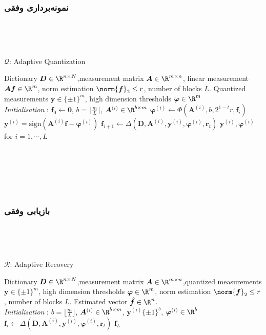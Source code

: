 ‎\begin{frame}‎
\frametitle{‎‏‏نمونه‌برداری وفقی}
‎\begin{latin}‎
‎\begin{algorithm}
	\caption{$ \mathcal{Q} $: Adaptive Quantization}
	\label{alg:AQ}
	\begin{algorithmic}[1]
		\renewcommand{\algorithmicrequire}{\textbf{Input:}}
		\renewcommand{\algorithmicensure}{\textbf{Output:}}
		\REQUIRE Dictionary $ \bm{D}\in\R^{n\times N} $,measurement matrix $ \bm{A}\in\R^{m\times n} $, linear measurement $ \bm{Af}\in \R^{m} $, norm estimation $ \norm{\bm{f}}_{2}\leq r $, number of blocks $ L $.
		\ENSURE  Quantized measurements $ \bm{y} \in \lbrace\pm 1\rbrace^{m} $, high dimension thresholds $ \bm{\varphi} \in \R^{m} $
		\\ \textit{Initialisation} : $ \bm{f}_{0}\leftarrow \bm{0} $, $ b = ‎\lfloor‎\frac{m}{L}‎\rfloor $, $ \bm{A}^{(i)}\in \R^{b\times m}  $
		\STATE $\bm{\varphi}^{\left(i\right)}\leftarrow \Phi(\bm{A}^{(i)},b,2^{1-t}r,\bm{f}_{i}) $
		\STATE $ \bm{y}^{\left(i\right)} = \text{sign}\left(\bm{A}^{(i)}\bm{f}-\bm{\varphi}^{\left(i\right)}\right)$
		\STATE $ \bm{f}_{i+1}\leftarrow \varDelta\left(\bm{D},\bm{A}^{(i)},\bm{y}^{\left(i\right)},\bm{\varphi}^{\left(i\right)},\bm{r}‎_{t}\right) $
		\ENDFOR
		\RETURN $ \bm{y}^{\left(i\right)},\bm{\varphi}^{\left(i\right)} $ for $ i=1,\cdots,L $
	\end{algorithmic} 
\end{algorithm}
\end{latin}‎
‎\end{frame}‎
‎
‎\begin{frame}‎
\frametitle{بازیابی وفقی}
‎\begin{latin}‎
‎\begin{algorithm}
	\caption{$ \mathcal{R} $: Adaptive Recovery}
	\label{alg:AR}
	\begin{algorithmic}[1]
		\renewcommand{\algorithmicrequire}{\textbf{Input:}}
		\renewcommand{\algorithmicensure}{\textbf{Output:}}
		\REQUIRE Dictionary $ \bm{D}\in\R^{n\times N} $,measurement matrix $ \bm{A}\in\R^{m\times n} $,quantized measurements $ \bm{y} \in \lbrace\pm 1\rbrace^{m} $, high dimension thresholds $ \bm{\varphi}\in\R^{m} $, norm estimation $ \norm{\bm{f}}_{2}\leq r $, number of blocks $ L $.
		\ENSURE  Estimated vector $ \hat{\bm{f}}\in \R^{n} $.
		\\ \textit{Initialisation} :  $ b = ‎\lfloor‎\frac{m}{L}‎\rfloor‎ $, $ \bm{A}^{(i)}\in \R^{b\times m}$, $ \bm{y}^{\left(i\right)} \lbrace\pm 1\rbrace^{b}$, $\bm{\varphi}^{\left(i\right)}\in \R^{b} $
		\STATE $ \bm{f}_{i}\leftarrow \varDelta\left(\bm{D},\bm{A}^{(i)},\bm{y}^{\left(i\right)},\bm{\varphi}^{\left(i\right)},\bm{r}‎_{t}‎\right) $
		\ENDFOR
		\RETURN $ \bm{f}_{L} $
	\end{algorithmic} 
\end{algorithm}
\end{latin}‎
‎\end{frame}‎

